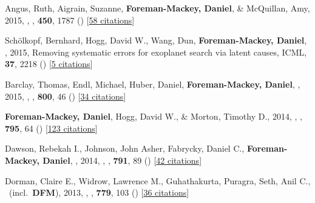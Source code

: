 \item[{\color{numcolor}\scriptsize9}] Angus, Ruth, Aigrain, Suzanne, \textbf{Foreman-Mackey, Daniel}, \& McQuillan, Amy, 2015, , \mnras, \textbf{450}, 1787 () [\href{http://adsabs.harvard.edu/abs/2015MNRAS.450.1787A}{58 citations}]

\item[{\color{numcolor}\scriptsize8}] Sch{\"o}lkopf, Bernhard, Hogg, David W., Wang, Dun, \textbf{Foreman-Mackey, Daniel}, \etal, 2015, Removing systematic errors for exoplanet search via latent causes, ICML, \textbf{37}, 2218 () [\href{https://scholar.google.com/scholar?cites=11768165421845046384}{5 citations}]

\item[{\color{numcolor}\scriptsize7}] Barclay, Thomas, Endl, Michael, Huber, Daniel, \textbf{Foreman-Mackey, Daniel}, \etal, 2015, , \apj, \textbf{800}, 46 () [\href{http://adsabs.harvard.edu/abs/2015ApJ...800...46B}{34 citations}]

\item[{\color{numcolor}\scriptsize6}] \textbf{Foreman-Mackey, Daniel}, Hogg, David W., \& Morton, Timothy D., 2014, , \apj, \textbf{795}, 64 () [\href{http://adsabs.harvard.edu/abs/2014ApJ...795...64F}{123 citations}]

\item[{\color{numcolor}\scriptsize5}] Dawson, Rebekah I., Johnson, John Asher, Fabrycky, Daniel C., \textbf{Foreman-Mackey, Daniel}, \etal, 2014, , \apj, \textbf{791}, 89 () [\href{http://adsabs.harvard.edu/abs/2014ApJ...791...89D}{42 citations}]

\item[{\color{numcolor}\scriptsize4}] Dorman, Claire E., Widrow, Lawrence M., Guhathakurta, Puragra, Seth, Anil C., \etal\ (incl.\ \textbf{DFM}), 2013, , \apj, \textbf{779}, 103 () [\href{http://adsabs.harvard.edu/abs/2013ApJ...779..103D}{36 citations}]

